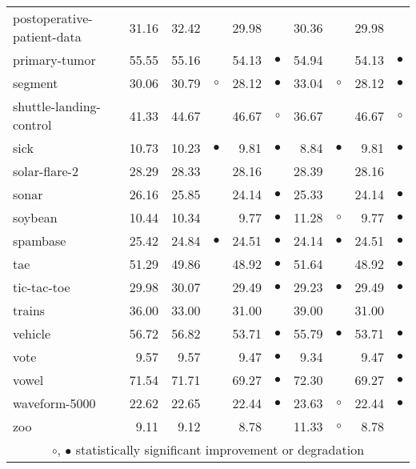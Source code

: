 {\begin{longtable}{lrr@{\hspace{0.1cm}}cr@{\hspace{0.1cm}}cr@{\hspace{0.1cm}}cr@{\hspace{0.1cm}}c}
postoperative-patient-data & 31.16 & 32.42 &           & 29.98 &           & 30.36 &            & 29.98 &          \\
primary-tumor & 55.55 & 55.16 &           & 54.13 & $\bullet$ & 54.94 &            & 54.13 & $\bullet$\\
segment & 30.06 & 30.79 &   $\circ$ & 28.12 & $\bullet$ & 33.04 &    $\circ$ & 28.12 & $\bullet$\\
shuttle-landing-control & 41.33 & 44.67 &           & 46.67 &   $\circ$ & 36.67 &            & 46.67 &   $\circ$\\
sick & 10.73 & 10.23 & $\bullet$ &  9.81 & $\bullet$ &  8.84 &  $\bullet$ &  9.81 & $\bullet$\\
solar-flare-2 & 28.29 & 28.33 &           & 28.16 &           & 28.39 &            & 28.16 &          \\
sonar & 26.16 & 25.85 &           & 24.14 & $\bullet$ & 25.33 &            & 24.14 & $\bullet$\\
soybean & 10.44 & 10.34 &           &  9.77 & $\bullet$ & 11.28 &    $\circ$ &  9.77 & $\bullet$\\
spambase & 25.42 & 24.84 & $\bullet$ & 24.51 & $\bullet$ & 24.14 &  $\bullet$ & 24.51 & $\bullet$\\
tae & 51.29 & 49.86 &           & 48.92 & $\bullet$ & 51.64 &            & 48.92 & $\bullet$\\
tic-tac-toe & 29.98 & 30.07 &           & 29.49 & $\bullet$ & 29.23 &  $\bullet$ & 29.49 & $\bullet$\\
trains & 36.00 & 33.00 &           & 31.00 &           & 39.00 &            & 31.00 &          \\
vehicle & 56.72 & 56.82 &           & 53.71 & $\bullet$ & 55.79 &  $\bullet$ & 53.71 & $\bullet$\\
vote &  9.57 &  9.57 &           &  9.47 & $\bullet$ &  9.34 &            &  9.47 & $\bullet$\\
vowel & 71.54 & 71.71 &           & 69.27 & $\bullet$ & 72.30 &            & 69.27 & $\bullet$\\
waveform-5000 & 22.62 & 22.65 &           & 22.44 & $\bullet$ & 23.63 &    $\circ$ & 22.44 & $\bullet$\\
zoo &  9.11 &  9.12 &           &  8.78 &           & 11.33 &    $\circ$ &  8.78 &          \\
\hline
\multicolumn{10}{c}{$\circ$, $\bullet$ statistically significant improvement or degradation}\\
\end{longtable} \footnotesize \par}